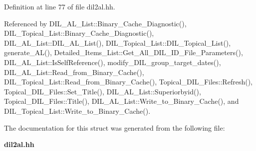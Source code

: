 Definition at line 77 of file dil2al.hh.

Referenced by DIL\_\-AL\_\-List::Binary\_\-Cache\_\-Diagnostic(), DIL\_\-Topical\_\-List::Binary\_\-Cache\_\-Diagnostic(), DIL\_\-AL\_\-List::DIL\_\-AL\_\-List(), DIL\_\-Topical\_\-List::DIL\_\-Topical\_\-List(), generate\_\-AL(), Detailed\_\-Items\_\-List::Get\_\-All\_\-DIL\_\-ID\_\-File\_\-Parameters(), DIL\_\-AL\_\-List::Is\-Self\-Reference(), modify\_\-DIL\_\-group\_\-target\_\-dates(), DIL\_\-AL\_\-List::Read\_\-from\_\-Binary\_\-Cache(), DIL\_\-Topical\_\-List::Read\_\-from\_\-Binary\_\-Cache(), Topical\_\-DIL\_\-Files::Refresh(), Topical\_\-DIL\_\-Files::Set\_\-Title(), DIL\_\-AL\_\-List::Superiorbyid(), Topical\_\-DIL\_\-Files::Title(), DIL\_\-AL\_\-List::Write\_\-to\_\-Binary\_\-Cache(), and DIL\_\-Topical\_\-List::Write\_\-to\_\-Binary\_\-Cache().

The documentation for this struct was generated from the following file:\begin{CompactItemize}
\item 
{\bf dil2al.hh}\end{CompactItemize}

